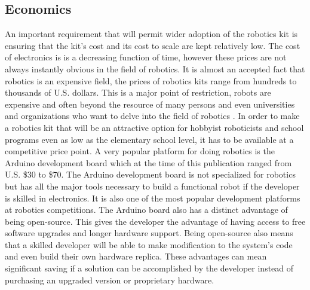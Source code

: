 \subsection{Economics} %
An important requirement that will permit wider adoption of the robotics kit is ensuring that the kit's cost and its cost to scale are kept relatively low. The cost of electronics is is a decreasing function of time, however these prices are not always instantly obvious in the field of robotics. It is almost an accepted fact that robotics is an expensive field, the prices of robotics kits range from hundreds to thousands of U.S. dollars. This is a major point of restriction, robots are expensive and often beyond the resource of many persons and even universities and organizations who want to delve into the field of robotics \parencite{vr}. In order to make a robotics kit that will be an attractive option for hobbyist roboticists and school programs even as low as the elementary school level, it has to be available at a competitive price point. A very popular platform for doing robotics is the Arduino development board which at the time of this publication ranged from U.S. \$30 to \$70. The Arduino development board is not specialized for robotics but has all the major tools necessary to build a functional robot if the developer is skilled in electronics. It is also one of the most popular development platforms at robotics competitions.
The Arduino board also has a distinct advantage of being open-source. This gives the developer the advantage of having access to free software upgrades and longer hardware support. Being open-source also means that a skilled developer will be able to make modification to the system's code and even build their own hardware replica. These advantages can mean significant saving if a solution can be accomplished by the developer instead of purchasing an upgraded version or proprietary hardware.

\label{sub:economics}


